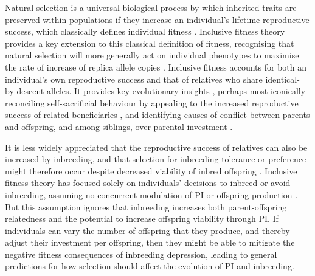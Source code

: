 \documentclass[12pt]{article}
\begin{document}
Natural selection is a universal biological process by which inherited traits are preserved within populations if they increase an individual's lifetime reproductive success, which classically defines individual fitness \cite[][]{Darwin1859, Dawkins1982}. Inclusive fitness theory \citeyearpar[][]{Hamilton1964, Hamilton1964a} provides a key extension to this classical definition of fitness, recognising that natural selection will more generally act on individual phenotypes to maximise the rate of increase of replica allele copies \cite[][]{Grafen2006}. Inclusive fitness accounts for both an individual's own reproductive success and that of relatives who share identical-by-descent alleles. It provides key evolutionary insights \cite[][]{Gardner2014}, perhaps most iconically reconciling self-sacrificial behaviour by appealing to the increased reproductive success of related beneficiaries \cite[][]{Hamilton1964}, and identifying causes of conflict between parents and offspring, and among siblings, over parental investment \cite[hereafter `PI';][]{Trivers1972, Trivers1974}.

It is less widely appreciated that the reproductive success of relatives can also be increased by inbreeding, and that selection for inbreeding tolerance or preference might therefore occur despite decreased viability of inbred offspring \cite[i.e., ``inbreeding depression'';][]{Parker1979}. Inclusive fitness theory has focused solely on individuals' decisions to inbreed or avoid inbreeding, assuming no concurrent modulation of PI or offspring production \cite[e.g.,][]{Parker2006, Kokko2006, Duthie2015a}. But this assumption ignores that inbreeding increases both parent-offspring relatedness and the potential to increase offspring viability through PI. If individuals can vary the number of offspring that they produce, and thereby adjust their investment per offspring, then they might be able to mitigate the negative fitness consequences of inbreeding depression, leading to general predictions for how selection should affect the evolution of PI and inbreeding.
\end{document}
